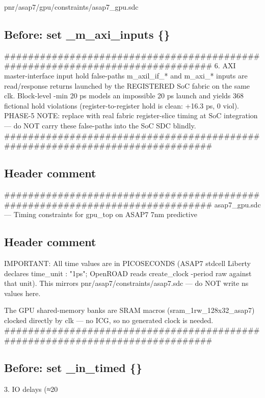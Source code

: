 \begin{relocated}{pnr/asap7/gpu/constraints/asap7_gpu.sdc}

\subsection*{Before: set \_m\_axi\_inputs \{\}}

\begin{textblock}
##############################################################################
6. AXI master-interface input hold false-paths
   m_axil_if_* and m_axi_* inputs are read/response returns launched by the
   REGISTERED SoC fabric on the same clk. Block-level -min 20 ps models an
   impossible 20 ps launch and yields 368 fictional hold violations
   (register-to-register hold is clean: +16.3 ps, 0 viol).
   PHASE-5 NOTE: replace with real fabric register-slice timing at SoC
   integration — do NOT carry these false-paths into the SoC SDC blindly.
##############################################################################
\end{textblock}

\subsection*{Header comment}

\begin{textblock}
##############################################################################
asap7_gpu.sdc — Timing constraints for gpu_top on ASAP7 7nm predictive
\end{textblock}

\subsection*{Header comment}

\begin{textblock}
IMPORTANT: All time values are in PICOSECONDS (ASAP7 stdcell Liberty declares
time_unit : "1ps"; OpenROAD reads create_clock -period raw against that unit).
This mirrors pnr/asap7/constraints/asap7.sdc — do NOT write ns values here.

The GPU shared-memory banks are SRAM macros (sram_1rw_128x32_asap7) clocked
directly by clk — no ICG, so no generated clock is needed.
##############################################################################
\end{textblock}

\subsection*{Before: set \_in\_timed \{\}}

\begin{textblock}
3. IO delays (≈20%
\end{textblock}

\end{relocated}

